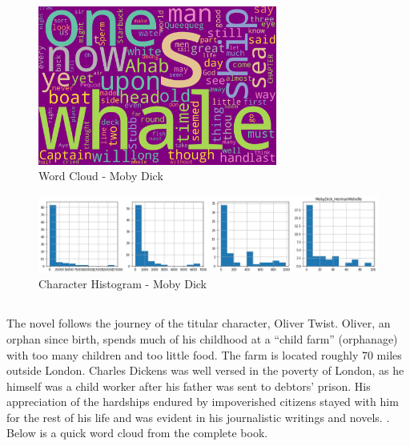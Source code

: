 \begin{figure}[H]
	\begin{center}
		\includegraphics[width = 0.7\textwidth]{Images/MobyDick_HermanMelville.jpeg} %
		\caption{Word Cloud - Moby Dick}
		\label{fig:moby-dick}
	\end{center}
\end{figure}

\begin{figure}[H]
	\begin{center}
		\includegraphics[width = 1.0\textwidth]{Images/char_hist_MobyDick_HermanMelville.jpeg} %
		\caption{Character Histogram - Moby Dick}
		\label{fig:histogram-mobydick}
	\end{center}
\end{figure}


\subsection{\textcite{oliver-twist}} %
\label{sec:oliver-twist} %

The novel follows the journey of the titular character, Oliver Twist. Oliver, an orphan since birth, spends much of his childhood at a “child farm” (orphanage) with too many children and too little food. The farm is located roughly 70 miles outside London. Charles Dickens was well versed in the poverty of London, as he himself was a child worker after his father was sent to debtors’ prison. His appreciation of the hardships endured by impoverished citizens stayed with him for the rest of his life and was evident in his journalistic writings and novels. \textcite{oliver-twist-summary}. Below is a quick word cloud from the complete book. 


